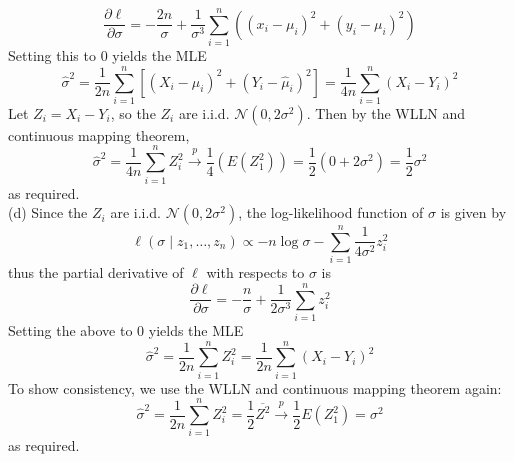 \documentclass[12pt]{article}
\begin{document}
\begin{enumerate}
{\begin{equation*}
  \frac{\partial \ell}{\partial \sigma} = -\frac{2n}{\sigma} + \frac{1}{\sigma^3}\sum_{i=1}^n ((x_i - \mu_i)^2 + (y_i - \mu_i)^2)
\end{equation*}
Setting this to 0 yields the MLE 
\begin{equation*}
  \hat\sigma^2 = \frac{1}{2n}\sum_{i=1}^n [(X_i - \hat\mu_i)^2 + (Y_i - \hat \mu_i)^2] = \frac{1}{4n} \sum_{i=1}^n (X_i - Y_i)^2
\end{equation*}
Let $Z_i = X_i - Y_i$, so the $Z_i$ are i.i.d. $\mathcal N(0, 2\sigma^2)$. Then by the WLLN and continuous mapping theorem, 
\begin{equation*}
  \hat\sigma^2 = \frac{1}{4n} \sum_{i=1}^n Z_i^2 \stackrel{p}{\to} \frac{1}{4}(E(Z_1^2)) = \frac{1}{2} (0 + 2\sigma^2) = \frac{1}{2}\sigma^2
\end{equation*}
as required. \\
(d) Since the $Z_i$ are i.i.d. $\mathcal N(0, 2\sigma^2)$, the log-likelihood function of $\sigma$ is given by 
\begin{equation*}
  \ell (\sigma \mid z_1,\ldots, z_n) \propto -n \log \sigma - \sum_{i=1}^n \frac{1}{4\sigma^2}z_i^2
\end{equation*}
thus the partial derivative of $\ell$ with respects to $\sigma$ is 
\begin{equation*}
  \frac{\partial \ell}{\partial \sigma} = -\frac{n}{\sigma} + \frac{1}{2\sigma^3} \sum_{i=1}^n z_i^2
\end{equation*}
Setting the above to 0 yields the MLE 
\begin{equation*}
  \hat\sigma^2 = \frac{1}{2n}\sum_{i=1}^n Z_i^2 = \frac{1}{2n}\sum_{i=1}^n (X_i - Y_i)^2
\end{equation*}
To show consistency, we use the WLLN and continuous mapping theorem again: 
\begin{equation*}
  \hat\sigma^2 = \frac{1}{2n}\sum_{i=1}^n Z_i^2 = \frac{1}{2}\overline{Z^2} \stackrel{p}{\to} \frac{1}{2}E(Z_1^2) = \sigma^2
\end{equation*}
as required. 
}


\end{enumerate}
\end{document}
